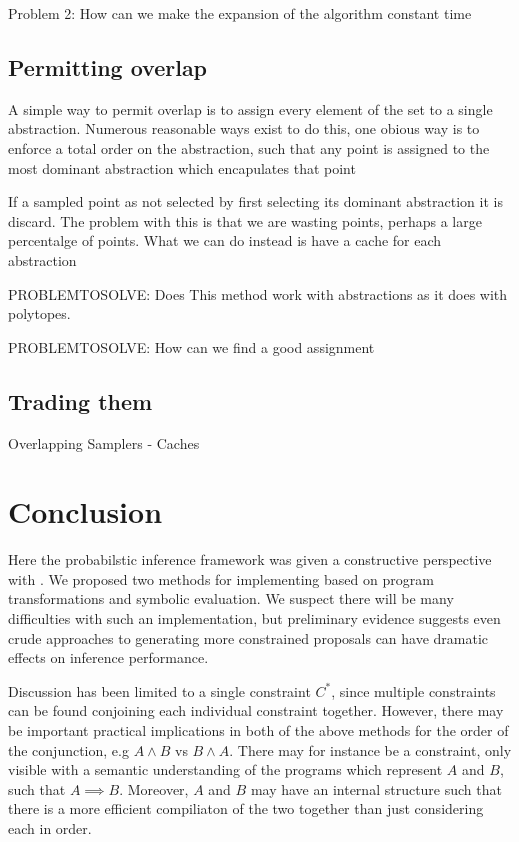 Problem 2: How can we make the expansion of the algorithm constant time

\subsection{Permitting overlap}
A simple way to permit overlap is to assign every element of the set to a single abstraction.
Numerous reasonable ways exist to do this, one obious way is to enforce a total order on the abstraction, such that any point is assigned to the most dominant abstraction which encapulates that point

If a sampled point as not selected by first selecting its dominant abstraction it is discard.
The problem with this is that we are wasting points, perhaps a large percentalge of points.
What we can do instead is have a cache for each abstraction

PROBLEMTOSOLVE: Does This method work with abstractions as it does with polytopes.

PROBLEMTOSOLVE: How can we find a good assignment

\subsection{Trading them}


Overlapping Samplers
- Caches



\section{Conclusion}
Here the probabilstic inference framework  was given a constructive perspective with .
We proposed two methods for implementing  based on program transformations and symbolic evaluation.
We suspect there will be many difficulties with such an implementation, but preliminary evidence suggests even crude approaches to generating more constrained proposals can have dramatic effects on inference performance.

Discussion has been limited to a single constraint $C^*$, since multiple constraints can be found conjoining each individual constraint together.
However, there may be important practical implications in both of the above methods for the order of the conjunction, e.g $A \land B$ vs $B \land A$.
There may for instance be a constraint, only visible with a semantic understanding of the programs which represent $A$ and $B$, such that $A \implies B$.
Moreover, $A$ and $B$ may have an internal structure such that there is a more efficient compiliaton of the two together than just considering each in order.

